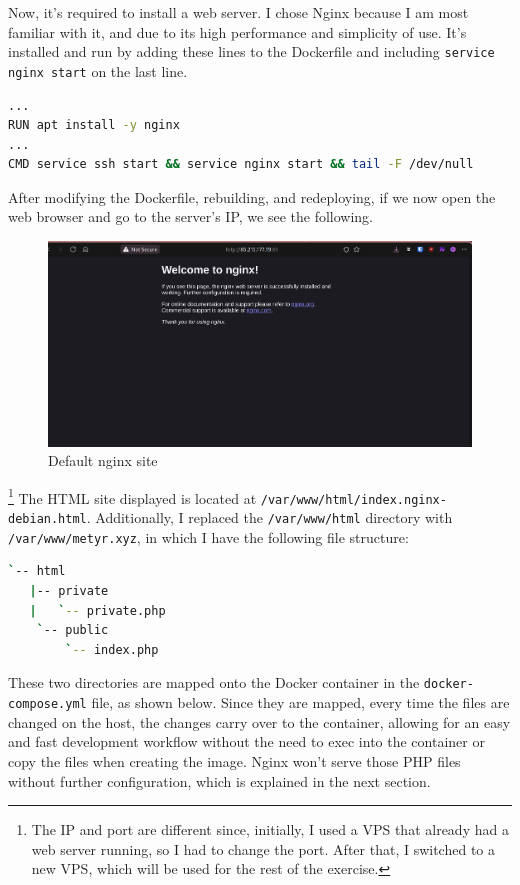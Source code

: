 \documentclass[a4paper]{article}
\newcommand{\abc}{\hfill \break}
\begin{document}
Now, it's required to install a web server. I chose Nginx because I am most familiar with it, and due to its high performance and simplicity of use.\abc
It’s installed and run by adding these lines to the Dockerfile and including \texttt{service nginx start} on the last line.
\begin{lstlisting}[language=bash]
...
RUN apt install -y nginx
...
CMD service ssh start && service nginx start && tail -F /dev/null
\end{lstlisting}
After modifying the Dockerfile, rebuilding, and redeploying, if we now open the web browser and go to the server's IP, we see the following.
\begin{figure}[h]
	\includegraphics[scale=0.2]{images/nginx.png}
	\centering
	\caption{Default nginx site}
\end{figure}\footnote{The IP and port are different since, initially, I used a VPS that already had a web server running, so I had to change the port. After that, I switched to a new VPS, which will be used for the rest of the exercise.}\abc
The HTML site displayed is located at \texttt{/var/www/html/index.nginx-debian.html}.
Additionally, I replaced the \texttt{/var/www/html} directory with \texttt{/var/www/metyr.xyz}, in which I have the following file structure:
\begin{lstlisting}[language=bash]
`-- html
   |-- private
   |   `-- private.php
    `-- public
        `-- index.php
\end{lstlisting}
These two directories are mapped onto the Docker container in the \texttt{docker-compose.yml} file, as shown below. Since they are mapped, every time the files are changed on the host, the changes carry over to the container, allowing for an easy and fast development workflow without the need to exec into the container or copy the files when creating the image.
Nginx won't serve those PHP files without further configuration, which is explained in the next section.
\end{document}
